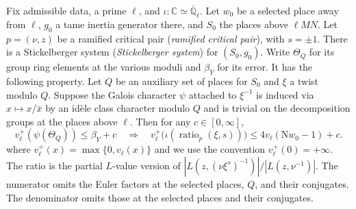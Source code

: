 \begin{lemma}
\label{lem:c-selmer-ratio-transfer}
\emitthmsource
Fix admissible data, a prime $\ell$, and $\iota\colon\mathbb C\simeq\overline{\mathbb Q}_\ell$. Let $w_0$ be a selected place away from $\ell$, $g_0$ a tame inertia generator there, and $S_0$ the places above $\ell MN$. Let $p=(\nu,z)$ be a ramified critical pair (\emph{ramified critical pair}), with $s=\pm1$. There is a Stickelberger system (\emph{Stickelberger system}) for $(S_0,g_0)$. Write $\Theta_Q$ for its group ring elements at the various moduli and $\beta_Y$ for its error. It has the following property.
Let $Q$ be an auxiliary set of places for $S_0$ and $\xi$ a twist modulo $Q$. Suppose the Galois character $\psi$ attached to $\xi^{-1}$ is induced via $x\mapsto x/\bar x$ by an idèle class character modulo $Q$ and is trivial on the decomposition groups at the places above $\ell$. Then for any $c\in[0,\infty]$,
\[
 v_\ell^+(\psi(\Theta_Q))\le\beta_Y+c
 \quad\Longrightarrow\quad
 v_\ell^+\bigl(\iota(\operatorname{ratio}_{p}(\xi,s))\bigr)
 \le4v_\ell(\mathrm Nw_0-1)+c .
\]
where $v_\ell^+(x)=\max\{0,v_\ell(x)\}$ and we use the convention $v_\ell^+(0)=+\infty$. The ratio is the partial $L$-value version of $|L(z,(\nu\xi^s)^{-1})|/|L(z,\nu^{-1})|$. The numerator omits the Euler factors at the selected places, $Q$, and their conjugates. The denominator omits those at the selected places and their conjugates.
\end{lemma}

